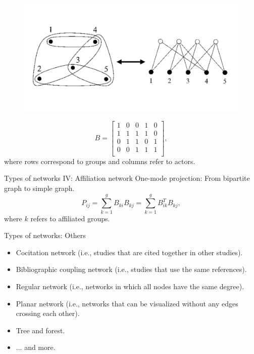 \documentclass[10pt]{beamer}
\begin{document}
\begin{frame}
	\begin{figure}
	\centering
	\includegraphics[scale=0.5]{Figs/bihy}
	\end{figure}
	\vspace{0.2cm}
	\begin{equation}
	B =
	\begin{bmatrix}
	1 & 0 & 0 & 1 & 0 \\
	1 & 1 & 1 & 1 & 0 \\
	0 & 1 & 1 & 0 & 1 \\
	0 & 0 & 1 & 1 & 1 \\
	\end{bmatrix},
	\end{equation}
where rows correspond to groups and columns refer to actors.
\end{frame}

\begin{frame}{Types of networks IV: Affiliation network}
One-mode projection: From bipartite graph to simple graph.
	\begin{equation}
	P_{ij} = \sum_{k=1}^g B_{ki}B_{kj} = \sum_{k=1}^g B_{ik}^{T}B_{kj},
	\end{equation}
where $k$ refers to affiliated groups.
\end{frame}

\begin{frame}{Types of networks: Others}
	\begin{itemize}
		\item Cocitation network (i.e., studies that are cited together in other studies).
		\item Bibliographic coupling network (i.e., studies that use the same references).
		\item Regular network (i.e., networks in which all nodes have the same degree).
		\item Planar network (i.e., networks that can be visualized without any edges crossing each other).		
		\item Tree and forest.
		\item ... and more.
	\end{itemize}
\end{frame}
\end{document}
